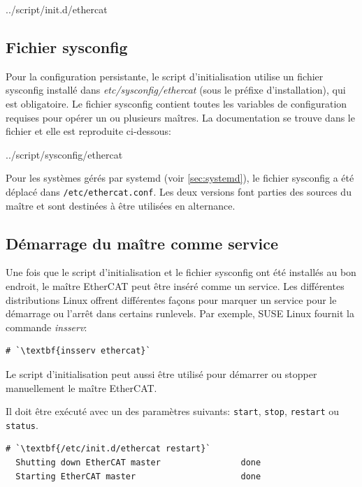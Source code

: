 \documentclass[a4paper,12pt,BCOR6mm,bibtotoc,idxtotoc]{scrbook}
\begin{document}

    {../script/init.d/ethercat}

\subsection{Fichier sysconfig}
\label{sec:sysconfig}

Pour la configuration persistante, le script d'initialisation utilise
un fichier sysconfig install\'e dans \textit{etc/sysconfig/ethercat}
(sous le pr\'efixe d'installation), qui est obligatoire.  Le fichier
sysconfig contient toutes les variables de configuration requises pour
op\'erer un ou plusieurs ma\^itres. La documentation se trouve dans le
fichier et elle est reproduite ci-dessous:


    {../script/sysconfig/ethercat}

    Pour les syst\`emes g\'er\'es par systemd (voir \autoref{sec:systemd}),
    le fichier sysconfig a \'et\'e d\'eplac\'e dans \lstinline+/etc/ethercat.conf+.
    Les deux versions font parties des sources du ma\^itre et sont destin\'ees
    \`a \^etre utilis\'ees en alternance.

\subsection{D\'emarrage du ma\^itre comme service}
\label{sec:service}

Une fois que le script d'initialisation et le fichier sysconfig ont
\'et\'e install\'es au bon endroit, le ma\^itre EtherCAT peut \^etre
ins\'er\'e comme un service.  Les diff\'erentes distributions Linux
offrent diff\'erentes fa\c{c}ons pour marquer un service pour le
d\'emarrage ou l'arr\^et dans certains runlevels. Par exemple, SUSE
Linux fournit la commande \textit{insserv}:

\begin{lstlisting}
# `\textbf{insserv ethercat}`
\end{lstlisting}

Le script d'initialisation peut aussi \^etre utilis\'e pour d\'emarrer
ou stopper manuellement le ma\^itre EtherCAT.

Il doit \^etre ex\'ecut\'e avec un des param\`etres suivants:
\texttt{start}, \texttt{stop}, \texttt{restart} ou \texttt{status}.

\begin{lstlisting}[gobble=2]
  # `\textbf{/etc/init.d/ethercat restart}`
  Shutting down EtherCAT master                done
  Starting EtherCAT master                     done
\end{lstlisting}
\end{document}
